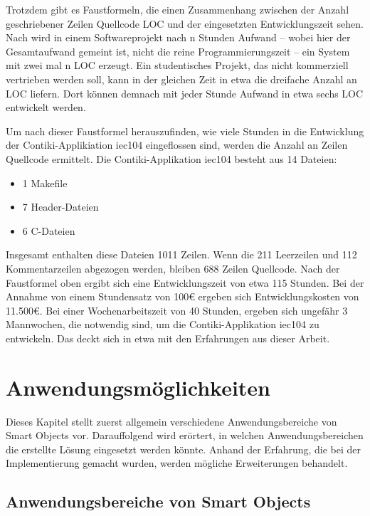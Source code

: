 Trotzdem gibt es Faustformeln, die einen Zusammenhang zwischen der Anzahl geschriebener Zeilen Quellcode LOC und der eingesetzten Entwicklungszeit sehen. Nach \cite[Seite 305]{Ludewig:SoftwareEngineering} wird in einem Softwareprojekt nach n Stunden Aufwand -- wobei hier der Gesamtaufwand gemeint ist, nicht die reine Programmierungszeit -- ein System mit zwei mal n LOC erzeugt. Ein studentisches Projekt, das nicht kommerziell vertrieben werden soll, kann in der gleichen Zeit in etwa die dreifache Anzahl an LOC liefern. Dort können demnach mit jeder Stunde Aufwand in etwa sechs LOC entwickelt werden.

Um nach dieser Faustformel herauszufinden, wie viele Stunden in die Entwicklung der Contiki-Applikiation iec104 eingeflossen sind, werden die Anzahl an Zeilen Quellcode ermittelt. Die Contiki-Applikation iec104 besteht aus 14 Dateien:
\begin{itemize}
	\itemsep 0pt
	\item 1 Makefile
	\item 7 Header-Dateien
	\item 6 C-Dateien
\end{itemize}

Insgesamt enthalten diese Dateien 1011 Zeilen. Wenn die 211 Leerzeilen und 112 Kommentarzeilen abgezogen werden, bleiben 688 Zeilen Quellcode. Nach der Faustformel oben ergibt sich eine Entwicklungszeit von etwa 115 Stunden. Bei der Annahme von einem Stundensatz von 100€ ergeben sich Entwicklungskosten von 11.500€. Bei einer Wochenarbeitszeit von 40 Stunden, ergeben sich ungefähr 3 Mannwochen, die notwendig sind, um die Contiki-Applikation iec104 zu entwickeln. Das deckt sich in etwa mit den Erfahrungen aus dieser Arbeit.



\section{Anwendungsmöglichkeiten}

Dieses Kapitel stellt zuerst allgemein verschiedene Anwendungsbereiche von Smart Objects vor. Darauffolgend wird erörtert, in welchen Anwendungsbereichen die erstellte Lösung eingesetzt werden könnte. Anhand der Erfahrung, die bei der Implementierung gemacht wurden, werden mögliche Erweiterungen behandelt.

\subsection{Anwendungsbereiche von Smart Objects}

